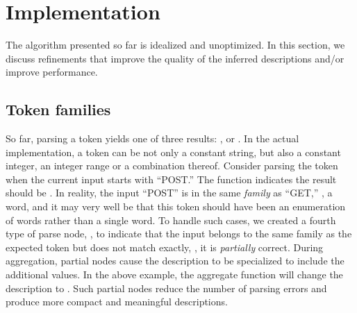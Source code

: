 \section{Implementation}
\label{sec:imp}
The algorithm presented so far is idealized and unoptimized.
In this section, we discuss refinements that improve the 
quality of the inferred descriptions and/or improve performance.

\subsection{Token families}
So far, parsing a  token yields
one of three results: ,  or . 
In the actual implementation, a  token can be not only a constant string, but also
a constant integer, an integer range or a combination thereof.
Consider parsing the token  when
the current input starts with ``POST.'' The
 function indicates the result should be .
In reality, the input ``POST'' is in the same {\em family} as ``GET,'' 
\ie{}, a word,
and it may very well be that this  token should have been 
an enumeration of words rather than a single word.
To handle such cases, we created a fourth type of parse node, , 
to indicate that the input belongs to the same family as the expected
token but does not match exactly, \ie, it is {\em partially} correct.
During aggregation, partial nodes cause the description 
to be specialized to include the additional values.  In the above example, the aggregate 
function will change the description to .
Such partial nodes reduce the number of parsing errors
and produce more compact and meaningful descriptions.


